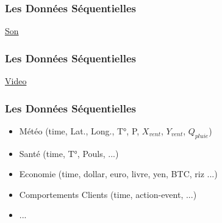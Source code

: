 \documentclass{formation}
\begin{document}
\begin{frame}
  \frametitle{Les Données Séquentielles}
  \underline{Son}
\end{frame}

\begin{frame}
  \frametitle{Les Données Séquentielles}
  \underline{Video}
\end{frame}

\begin{frame}
  \frametitle{Les Données Séquentielles}
  \begin{itemize}
  \item Météo (time, Lat., Long., T°, P, $X_{vent}$, $Y_{vent}$, $Q_{pluie}$)
  \item Santé (time, T°, Pouls, ...)
  \item Economie (time, dollar, euro, livre, yen, BTC, riz ...)
  \item Comportements Clients (time, action-event, ...)
  \item ...
  \end{itemize}
\end{frame}
\end{document}
